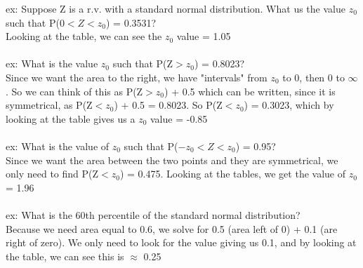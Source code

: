 \documentclass[12pt, a4paper]{article}
\begin{document}
	ex: Suppose Z is a r.v. with a standard normal distribution. What us the value $z_0$ such that P($0<Z<z_0$) = 0.3531? \\
	Looking at the table, we can see the $z_0$ value = 1.05 \\~\\
	ex: What is the value $z_0$ such that P(Z$>z_0$) = 0.8023? \\
	Since we want the area to the right, we have "intervals" from $z_0$ to 0, then 0 to $\infty$. So we can think of this as P(Z$>z_0$) + 0.5 which can be written, since it is symmetrical, as P(Z$<z_0$) + 0.5 = 0.8023. So P(Z$<z_0$) = 0.3023, which by looking at the table gives us a $z_0$ value = -0.85 \\~\\
	ex: What is the value of $z_0$ such that P($-z_0<Z<z_0$) = 0.95? \\
	Since we want the area between the two points and they are symmetrical, we only need to find P(Z$<z_0$) = 0.475. Looking at the tables, we get the value of $z_0$ = 1.96 \\~\\
	ex: What is the 60th percentile of the standard normal distribution? \\
	Because we need area equal to 0.6, we solve for 0.5 (area left of 0) + 0.1 (are right of zero). We only need to look for the value giving us 0.1, and by looking at the table, we can see this is $\approx$ 0.25 \newpage
	
\end{document}
